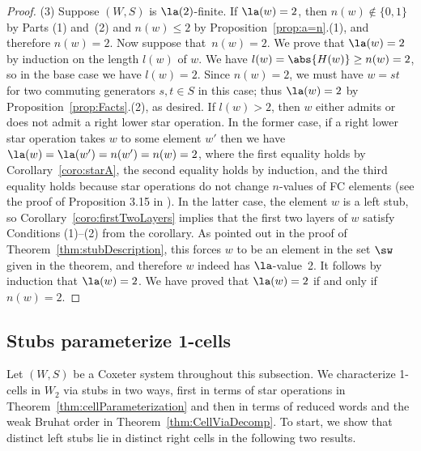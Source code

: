 \begin{remark}
\begin{proof}
(3) Suppose $(W,S)$ is $\la(2)$-finite. If $\la(w)=2$, then $n(w)\notin\{0,1\}$ by Parts (1) and~(2)
and $n(w)\le 2$ by Proposition~\ref{prop:a=n}.(1), and therefore $n(w)=2$. Now suppose that~$n(w)=2$. We prove that
$\la(w)=2$ by induction on the length $l(w)$ of $w$. We have $l(w)= \abs{H(w)}\ge n(w)=2$, so in the
base case we have $l(w)=2$. Since $n(w)=2$, we must have $w=st$ for two commuting generators $s,t\in
S$ in this case; thus $\la(w)=2$ by Proposition~\ref{prop:Facts}.(2), as desired.  If $l(w)>2$, then $w$
either admits or does not admit a right lower star operation. In the former case, if a right lower
star operation takes $w$ to some element $w'$ then we have $\la(w)=\la(w')=n(w')=n(w)=2$, where the
first equality holds by Corollary~\ref{coro:starA}, the second equality holds by induction, and the third
equality holds because star operations do not change $n$-values of FC elements (see the proof of
Proposition 3.15 in \cite{GreenXu}). In the latter case, the element $w$ is a left stub, so
Corollary~\ref{coro:firstTwoLayers} implies that the first two layers of $w$ satisfy Conditions (1)--(2) from
the corollary. As pointed out in the proof of Theorem~\ref{thm:stubDescription}, this forces $w$ to be an
element in the set $\sw$ given in the theorem, and therefore $w$ indeed has $\la$-value~2.  It
follows by induction that $\la(w)=2$. We have proved that $\la(w)=2$ if and only if~$n(w)=2$.
\end{proof}
    \end{remark}

\subsection{Stubs parameterize 1-cells}
\label{sec:1cells}
Let $(W,S)$ be a \ntatf Coxeter system throughout this subsection. We characterize 1-cells in $W_2$
via stubs in two ways, first in terms of star operations in Theorem~\ref{thm:cellParameterization} and then
in terms of reduced words and the weak Bruhat order in Theorem~\ref{thm:CellViaDecomp}. To start, we show
that distinct left stubs lie in distinct right cells in the following two results.

